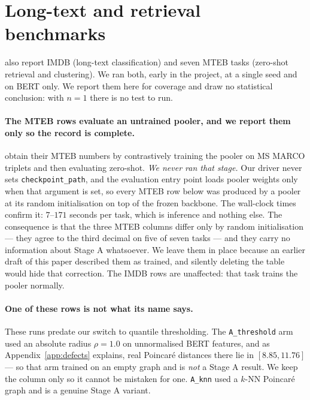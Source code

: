\documentclass{article}
\begin{document}
\section{Long-text and retrieval benchmarks}
\label{app:docmteb}

\citet{mantri2026glot} also report IMDB (long-text classification) and seven
MTEB tasks \citep{muennighoff2022mteb} (zero-shot retrieval and clustering). We
ran both, early in the project, at a single seed and on BERT only. We report them here for coverage and
draw no statistical conclusion: with $n=1$ there is no test to run.

\paragraph{The MTEB rows evaluate an untrained pooler, and we report them only
so the record is complete.} \citet{mantri2026glot} obtain their MTEB numbers by
contrastively training the pooler on MS MARCO triplets and then evaluating
zero-shot. \emph{We never ran that stage.} Our driver never sets
\texttt{checkpoint\_path}, and the evaluation entry point loads pooler weights
only when that argument is set, so every MTEB row below was produced by a pooler
at its random initialisation on top of the frozen backbone. The wall-clock times
confirm it: $7$--$171$ seconds per task, which is inference and nothing else.
The consequence is that the three MTEB columns differ only by random
initialisation --- they agree to the third decimal on five of seven tasks --- and
they carry no information about Stage A whatsoever. We leave them in place
because an earlier draft of this paper described them as trained, and silently
deleting the table would hide that correction. The IMDB rows are unaffected:
that task trains the pooler normally.

\paragraph{One of these rows is not what its name says.} These runs predate our
switch to quantile thresholding. The \texttt{A\_threshold} arm used an absolute
radius $\rho = 1.0$ on unnormalised BERT features, and as
Appendix~\ref{app:defects} explains, real Poincar\'e distances there lie in
$[8.85, 11.76]$ --- so that arm trained on an empty graph and is \emph{not} a
Stage A result. We keep the column only so it cannot be mistaken for one.
\texttt{A\_knn} used a $k$-NN Poincar\'e graph and is a genuine Stage A variant.
\end{document}
